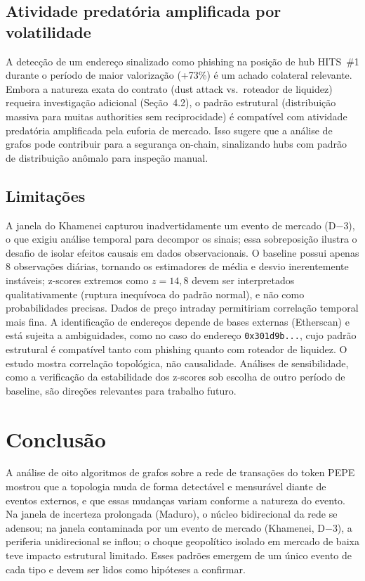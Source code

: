 \documentclass[12pt,a4paper]{article}
\begin{document}
\subsection{Atividade predatória amplificada por volatilidade}

A detecção de um endereço sinalizado como phishing na posição de hub HITS~\#1 durante o período de maior valorização (+73\%) é um achado colateral relevante. Embora a natureza exata do contrato (dust attack vs.\ roteador de liquidez) requeira investigação adicional (Seção~4.2), o padrão estrutural (distribuição massiva para muitas authorities sem reciprocidade) é compatível com atividade predatória amplificada pela euforia de mercado. Isso sugere que a análise de grafos pode contribuir para a segurança on-chain, sinalizando hubs com padrão de distribuição anômalo para inspeção manual.

\subsection{Limitações}

A janela do Khamenei capturou inadvertidamente um evento de mercado (D$-$3), o que exigiu análise temporal para decompor os sinais; essa sobreposição ilustra o desafio de isolar efeitos causais em dados observacionais. O baseline possui apenas 8 observações diárias, tornando os estimadores de média e desvio inerentemente instáveis; z-scores extremos como $z = 14{,}8$ devem ser interpretados qualitativamente (ruptura inequívoca do padrão normal), e não como probabilidades precisas. Dados de preço intraday permitiriam correlação temporal mais fina. A identificação de endereços depende de bases externas (Etherscan) e está sujeita a ambiguidades, como no caso do endereço \texttt{0x301d9b...}, cujo padrão estrutural é compatível tanto com phishing quanto com roteador de liquidez. O estudo mostra correlação topológica, não causalidade. Análises de sensibilidade, como a verificação da estabilidade dos z-scores sob escolha de outro período de baseline, são direções relevantes para trabalho futuro.

\section{Conclusão}

A análise de oito algoritmos de grafos sobre a rede de transações do token PEPE mostrou que a topologia muda de forma detectável e mensurável diante de eventos externos, e que essas mudanças variam conforme a natureza do evento. Na janela de incerteza prolongada (Maduro), o núcleo bidirecional da rede se adensou; na janela contaminada por um evento de mercado (Khamenei, D$-$3), a periferia unidirecional se inflou; o choque geopolítico isolado em mercado de baixa teve impacto estrutural limitado. Esses padrões emergem de um único evento de cada tipo e devem ser lidos como hipóteses a confirmar.
\end{document}
